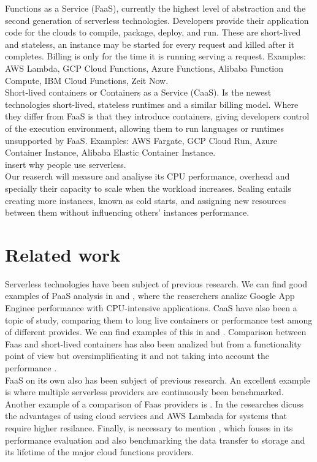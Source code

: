 \documentclass[11pt]{article}
\begin{document}
Functions as a Service (FaaS), currently the highest level of abstraction and the second generation of serverless technologies. Developers provide their application code for the clouds to compile, package, deploy, and run. These are short-lived and stateless, an instance may be started for every request and killed after it completes. Billing is only for the time it is running serving a request. Examples: AWS Lambda, GCP Cloud Functions, Azure Functions, Alibaba Function Compute, IBM Cloud Functions, Zeit Now.\\

Short-lived containers or Containers as a Service (CaaS). Is the newest technologies short-lived, stateless runtimes and a similar billing model. Where they differ from FaaS is that they introduce containers, giving developers control of the execution environment, allowing them to run languages or runtimes unsupported by FaaS. Examples: AWS Fargate, GCP Cloud Run, Azure Container Instance, Alibaba Elastic Container Instance. \\


insert why people use serverless. \\

Our reaserch will measure and analiyse its CPU performance, overhead and specially their capacity to scale when the workload increases. Scaling entails creating more instances, known as cold starts, and assigning new resources between them without influencing others' instances performance.


\section{Related work}

Serverless technologies have been subject of previous research.
We can find good examples of PaaS analysis in \cite{googleappengine} and \cite{googleappengine2},
where the reaserchers analize Google App Enginee performance with CPU-intensive applications.
CaaS have also been a topic of study,
comparing them to long live containers or performance test among of different provides.
We can find examples of this in \cite{cc} and \cite{dd}.
Comparison between Faas and short-lived containers has also been analized
but from a functionality point of view
but oversimplificating it and not taking into account the performance \cite{ee}\cite{ff}\cite{gg}. \\

FaaS on its own also has been subject of previous research.
An excellent example is \cite{aa}
where multiple serverless providers are continuously been benchmarked.
Another example of a comparison of Faas providers is \cite{bb}.
In \cite{14} the researches dicuss the advantages of using cloud services
and AWS Lambada for systems that require higher resilance.
Finally, is necessary to mention \cite{https://sci-hub.se/10.1002/cpe.4792},
which fouses in its performance evaluation
and also benchmarking the data transfer to storage and its lifetime of the major cloud functions providers. \\
\end{document}
